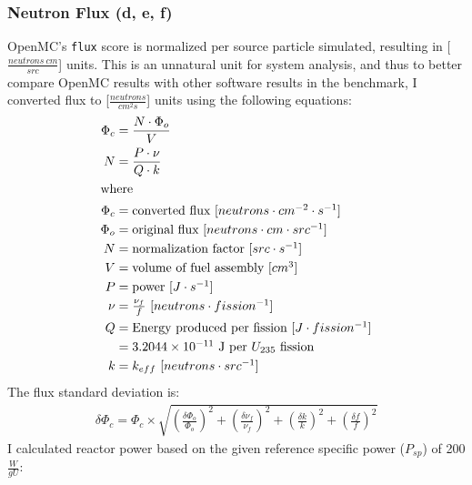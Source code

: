 \subsubsection{Neutron Flux (d, e, f)}
OpenMC's \texttt{flux} score is normalized per source particle simulated, resulting 
in [$\frac{neutrons\ cm}{src}$] units.
This is an unnatural unit for system analysis, and thus to better compare OpenMC
results with other software results in the benchmark, I converted flux to 
[$\frac{neutrons}{cm^2s}$] units using the following equations:  
\begin{align}
    \Phi_c &= \frac{N \cdot \Phi_o}{V} \\
    N &= \frac{P\cdot\nu}{Q\cdot k} \\
    \intertext{where}
    \Phi_c &= \mbox{converted flux [$neutrons \cdot cm^{-2} \cdot s^{-1}$]} \nonumber \\ 
    \Phi_o &= \mbox{original flux [$neutrons \cdot cm \cdot src^{-1}$]} \nonumber \\
    N &= \mbox{normalization factor [$src \cdot s^{-1}$]} \nonumber \\
    V &= \mbox{volume of fuel assembly [$cm^3$]} \nonumber \\
    P &= \mbox{power [$J \cdot s^{-1}$]} \nonumber \\
    \nu &= \mbox{$\frac{\nu_f}{f}$ [$neutrons \cdot fission^{-1}$]} \nonumber \\
    Q &= \mbox{Energy produced per fission [$J \cdot fission^{-1}$]} \nonumber \\
    &= \mbox{$3.2044 \times 10^{-11}$ J per $U_{235}$ fission} \nonumber \\
    k &= \mbox{$k_{eff}$ [$neutrons \cdot src^{-1}$]} \nonumber 
\end{align}
The flux standard deviation is: 
\begin{align}
    \delta \Phi_c = \Phi_c \times
    \sqrt{(\frac{\delta \Phi_o}{\Phi_o})^2+ (\frac{\delta \nu_f}{\nu_f})^2 
    + (\frac{\delta k}{k})^2 + (\frac{\delta f}{f})^2}
\end{align}
I calculated reactor power based on the given reference specific power 
($P_{sp}$) of 200 $\frac{W}{gU}$: 
